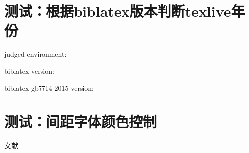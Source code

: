 \documentclass[twoside]{article}
\begin{document}
\section{测试：根据biblatex版本判断texlive年份}

judged environment:
\iftoggle{iftlfive}{biblatex<=3.2 maybe texlive<=2015 }{}%
\iftoggle{iftlsix}{3.3<=biblatex<=3.6 maybe texlive2016 }{}%
\iftoggle{iftlseven}{biblatex 3.7 maybe texlive 2017 }{}%
\iftoggle{iftleight}{biblatex 3.8-3.9 maybe texlive 2017 }{}%
\iftoggle{iftlnine}{biblatex 3.10 maybe texlive 2017 }{}%
\iftoggle{iftlatest}{biblatex >=3.11 maybe texlive 2018 }{}%

biblatex version: \versionofbiblatex

biblatex-gb7714-2015 version: \versionofgbtstyle


\section{测试：间距字体颜色控制}
    \begin{refsection}
    {

%
\renewcommand*{\newblockpunct}{\par\nobreak}

%
\renewcommand{\bibfont}{\zihao{-5}}%
\renewcommand{\bibauthorfont}{\bfseries\color{teal}}%
\renewcommand{\bibtitlefont}{\ttfamily\color{blue}}%
\renewcommand{\bibpubfont}{\itshape\color{violet}}%
\def\UrlFont{\ttfamily} %

\setlength{\bibitemsep}{0ex}
\setlength{\bibnamesep}{0ex}
\setlength{\bibinitsep}{0ex}



    文献
\cite{张伯伟2002--}
\cite{白书农1998-146-163}
\cite{杨洪升2013-56-75}
\cite{中华医学会湖北分会1984--}
\cite{雷光春2012--}
\cite{贾东琴2011-45-52}
\cite{汤万金2013-09-30--}
\cite{韩吉人1985-90-99}
\cite{马欢2011-27-27}
\cite{张凯军2012-04-05--}
\cite{国家环境保护局科技标准司1996-2-3}
\cite{中国职工教育研究会1985--}
\cite{丁文祥2000--}
\cite{李强2012-05-03--}

\cite{OBRIEN1994--}
\cite{FOURNEY1971-17-38}
\cite{Park2010-696-715}
\cite{Babu2014--}
\cite{Calkin2011-8-9}
\cite{CALMS1965--}
\cite{KOSEKI2002--}
\cite{standardinfoiso158}
\cite{Dublin2012-06-14--}


\printbibliography[heading=subbibliography,title=【参考文献】]
}

    \end{refsection}
\end{document}
